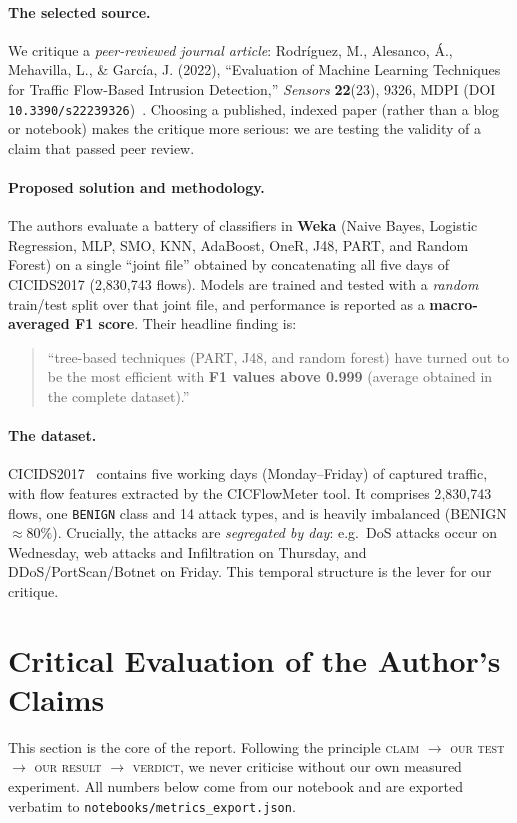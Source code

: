 \documentclass[11pt,a4paper]{article}
\begin{document}
\paragraph{The selected source.}
We critique a \emph{peer-reviewed journal article}:
Rodr\'iguez, M., Alesanco, \'A., Mehavilla, L., \& Garc\'ia, J. (2022),
``Evaluation of Machine Learning Techniques for Traffic Flow-Based Intrusion Detection,''
\emph{Sensors} \textbf{22}(23), 9326, MDPI (DOI \texttt{10.3390/s22239326})~\cite{rodriguez2022}.
Choosing a published, indexed paper (rather than a blog or notebook) makes the critique more
serious: we are testing the validity of a claim that passed peer review.

\paragraph{Proposed solution and methodology.}
The authors evaluate a battery of classifiers in \textbf{Weka} (Naive Bayes, Logistic
Regression, MLP, SMO, KNN, AdaBoost, OneR, J48, PART, and Random Forest) on a single
``joint file'' obtained by concatenating all five days of CICIDS2017
(2{,}830{,}743 flows). Models are trained and tested with a \emph{random} train/test split
over that joint file, and performance is reported as a \textbf{macro-averaged F1 score}.
Their headline finding is:
\begin{quote}
``tree-based techniques (PART, J48, and random forest) have turned out to be the most
efficient with \textbf{F1 values above 0.999} (average obtained in the complete dataset).''
\end{quote}

\paragraph{The dataset.}
CICIDS2017~\cite{sharafaldin2018} contains five working days (Monday--Friday) of captured
traffic, with flow features extracted by the CICFlowMeter tool. It comprises
2{,}830{,}743 flows, one \texttt{BENIGN} class and 14 attack types, and is heavily
imbalanced (BENIGN $\approx 80\%$). Crucially, the attacks are \emph{segregated by day}:
e.g.\ DoS attacks occur on Wednesday, web attacks and Infiltration on Thursday, and
DDoS/PortScan/Botnet on Friday. This temporal structure is the lever for our critique.

\section{Critical Evaluation of the Author's Claims}
This section is the core of the report. Following the principle
\textsc{claim} $\rightarrow$ \textsc{our test} $\rightarrow$ \textsc{our result}
$\rightarrow$ \textsc{verdict}, we never criticise without our own measured experiment.
All numbers below come from our notebook and are exported verbatim to
\texttt{notebooks/metrics\_export.json}.
\end{document}
